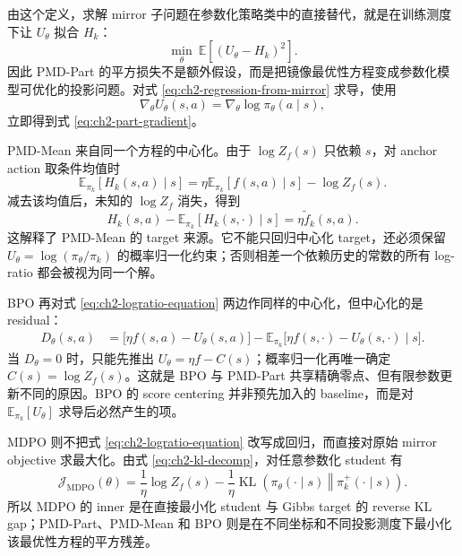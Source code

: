 由这个定义，求解 mirror 子问题在参数化策略类中的直接替代，就是在训练测度下让 $U_\theta$ 拟合 $H_k$：
\begin{equation}
\label{eq:ch2-regression-from-mirror}
\min_\theta\ \mathbb E\left[(U_\theta-H_k)^2\right].
\end{equation}
因此 PMD-Part 的平方损失不是额外假设，而是把镜像最优性方程变成参数化模型可优化的投影问题。对式 \eqref{eq:ch2-regression-from-mirror} 求导，使用
\[
\nabla_\theta U_\theta(s,a)=\nabla_\theta\log\pi_\theta(a\mid s),
\]
立即得到式 \eqref{eq:ch2-part-gradient}。

PMD-Mean 来自同一个方程的中心化。由于 $\log Z_f(s)$ 只依赖 $s$，对 anchor action 取条件均值时
\[
\mathbb E_{\pi_k}[H_k(s,a)\mid s]
=\eta\mathbb E_{\pi_k}[f(s,a)\mid s]-\log Z_f(s).
\]
减去该均值后，未知的 $\log Z_f$ 消失，得到
\begin{equation}
\label{eq:ch2-centered-logratio-equation}
H_k(s,a)-\mathbb E_{\pi_k}[H_k(s,\cdot)\mid s]
=\eta\widetilde f_k(s,a).
\end{equation}
这解释了 PMD-Mean 的 target 来源。它不能只回归中心化 target，还必须保留 $U_\theta=\log(\pi_\theta/\pi_k)$ 的概率归一化约束；否则相差一个依赖历史的常数的所有 log-ratio 都会被视为同一个解。

BPO 再对式 \eqref{eq:ch2-logratio-equation} 两边作同样的中心化，但中心化的是 residual：
\begin{align}
D_\theta(s,a)
&=\bigl[\eta f(s,a)-U_\theta(s,a)\bigr]
-\mathbb E_{\pi_k}\bigl[\eta f(s,\cdot)-U_\theta(s,\cdot)\mid s\bigr].
\label{eq:ch2-bpo-from-optimality}
\end{align}
当 $D_\theta=0$ 时，只能先推出 $U_\theta=\eta f-C(s)$；概率归一化再唯一确定 $C(s)=\log Z_f(s)$。这就是 BPO 与 PMD-Part 共享精确零点、但有限参数更新不同的原因。BPO 的 score centering 并非预先加入的 baseline，而是对 $\mathbb E_{\pi_k}[U_\theta]$ 求导后必然产生的项。

MDPO 则不把式 \eqref{eq:ch2-logratio-equation} 改写成回归，而直接对原始 mirror objective 求最大化。由式 \eqref{eq:ch2-kl-decomp}，对任意参数化 student 有
\begin{equation}
\label{eq:ch2-mdpo-kl-gap}
\mathcal J_{\mathrm{MDPO}}(\theta)
=\frac1\eta\log Z_f(s)
-\frac1\eta\operatorname{KL}\!\left(\pi_\theta(\cdot\mid s)\middle\Vert\pi_k^+(\cdot\mid s)\right).
\end{equation}
所以 MDPO 的 inner 是在直接最小化 student 与 Gibbs target 的 reverse KL gap；PMD-Part、PMD-Mean 和 BPO 则是在不同坐标和不同投影测度下最小化该最优性方程的平方残差。

